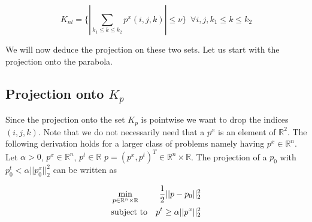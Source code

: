     \begin{equation}
        K_{nl} = \bigg\{ \left| \sum_{k_{1} \le k \le k_{2}} p^{x}(i, j, k) \right| \le \nu \bigg\} \,\,\, \forall i, j, k_{1} \le k \le k_{2} \label{eq:nonlocal}
    \end{equation}

    We will now deduce the projection on these two sets. Let us start with the projection onto the parabola.

    \subsection{Projection onto $K_{p}$}

        Since the projection onto the set $K_{p}$ is pointwise we want to drop the indices $(i, j, k)$. Note that we do not necessarily need that a $p^{x}$ is an element of $\mathbb{R}^{2}$. The following derivation holds for a larger class of problems namely having $p^{x} \in \mathbb{R}^{n}$.
            Let $\alpha > 0$, $p^{x} \in \mathbb{R}^{n}$, $p^{t} \in \mathbb{R}$ %
            $p = (p^{x}, p^{t})^{T} \in \mathbb{R}^{n} \times \mathbb{R}$.
            The projection of a $p_{0}$ with $p_{0}^{t} < \alpha ||p_{0}^{x}||_{2}^{2}$ can be written as

            \begin{eqnarray}
                &\min\limits_{p \in \mathbb{R}^{n} \times \mathbb{R}}& \frac{1}{2} ||p - p_{0}||_{2}^{2} \notag \\
                &\textnormal{subject to}& p^{t} \ge \alpha||p^{x}||_{2}^{2} \notag
            \end{eqnarray}

